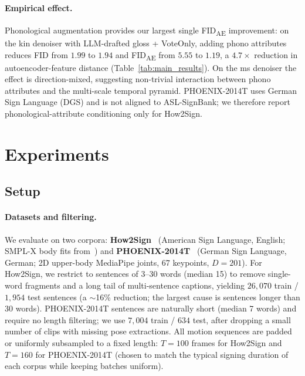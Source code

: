 \documentclass{article}
\begin{document}
\paragraph{Empirical effect.}
Phonological augmentation provides our largest single FID\textsubscript{AE} improvement: on the kin denoiser with LLM-drafted gloss + VoteOnly, adding phono attributes reduces FID from $1.99$ to $1.94$ and FID\textsubscript{AE} from $5.55$ to $1.19$, a $4.7\times$ reduction in autoencoder-feature distance (Table~\ref{tab:main_results}). On the ms denoiser the effect is direction-mixed, suggesting non-trivial interaction between phono attributes and the multi-scale temporal pyramid. PHOENIX-2014T uses German Sign Language (DGS) and is not aligned to ASL-SignBank; we therefore report phonological-attribute conditioning only for How2Sign.

\section{Experiments}
\label{sec:experiments}

\subsection{Setup}
\label{sec:setup}

\paragraph{Datasets and filtering.}
We evaluate on two corpora: \textbf{How2Sign}~\citep{duarte2021how2sign} (American Sign Language, English; SMPL-X body fits from~\citep{hong2026phonologyguided}) and \textbf{PHOENIX-2014T}~\citep{camgoz2018neural} (German Sign Language, German; 2D upper-body MediaPipe joints, 67 keypoints, $D = 201$).
For How2Sign, we restrict to sentences of 3--30 words (median 15) to remove single-word fragments and a long tail of multi-sentence captions, yielding $26{,}070$ train / $1{,}954$ test sentences (a $\sim$16\% reduction; the largest cause is sentences longer than 30 words).
PHOENIX-2014T sentences are naturally short (median 7 words) and require no length filtering; we use $7{,}004$ train / $634$ test, after dropping a small number of clips with missing pose extractions.
All motion sequences are padded or uniformly subsampled to a fixed length: $T=100$ frames for How2Sign and $T=160$ for PHOENIX-2014T (chosen to match the typical signing duration of each corpus while keeping batches uniform).
\end{document}
